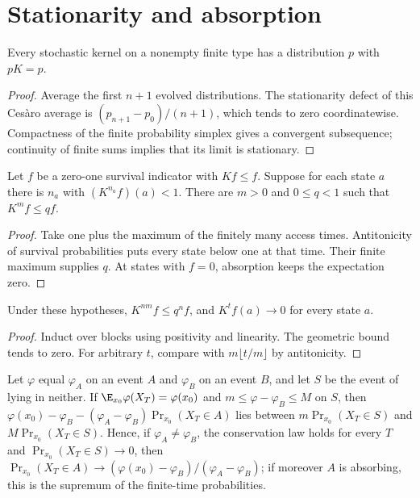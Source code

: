 \section{Stationarity and absorption}
\begin{theorem}\label{thm:stationary}
\leanok{}
Every stochastic kernel on a nonempty finite type has a distribution $p$ with $pK=p$.
\end{theorem}
\begin{proof}\leanok
Average the first $n+1$ evolved distributions. The stationarity defect of this
Ces\`aro average is $(p_{n+1}-p_0)/(n+1)$, which tends to zero coordinatewise.
Compactness of the finite probability simplex gives a convergent subsequence;
continuity of finite sums implies that its limit is stationary.
\end{proof}
\begin{lemma}\label{lem:block}
\leanok{}
Let $f$ be a zero-one survival indicator with $Kf\le f$. Suppose for each
state $a$ there is $n_a$ with $(K^{n_a}f)(a)<1$. There are $m>0$ and
$0\le q<1$ such that $K^m f\le qf$.
\end{lemma}
\begin{proof}\leanok
Take one plus the maximum of the finitely many access times. Antitonicity of
survival probabilities puts every state below one at that time. Their finite
maximum supplies $q$. At states with $f=0$, absorption keeps the expectation zero.
\end{proof}
\begin{theorem}\label{thm:absorption}
\leanok{}
Under these hypotheses, $K^{nm}f\le q^n f$, and $K^t f(a)\to0$ for every state $a$.
\end{theorem}
\begin{proof}\leanok
Induct over blocks using positivity and linearity. The geometric bound tends
to zero. For arbitrary $t$, compare with $m\lfloor t/m\rfloor$ by antitonicity.
\end{proof}
\begin{theorem}\label{thm:optional-stopping}
\leanok{}
Let $\varphi$ equal $\varphi_A$ on an event $A$ and $\varphi_B$ on an event $B$, and let
$S$ be the event of lying in neither. If $\E_{x_0}\varphi(X_T)=\varphi(x_0)$ and
$m\le\varphi-\varphi_B\le M$ on $S$, then
$\varphi(x_0)-\varphi_B-(\varphi_A-\varphi_B)\Pr_{x_0}(X_T\in A)$ lies between
$m\Pr_{x_0}(X_T\in S)$ and $M\Pr_{x_0}(X_T\in S)$. Hence, if $\varphi_A\ne\varphi_B$,
the conservation law holds for every $T$ and $\Pr_{x_0}(X_T\in S)\to0$, then
$\Pr_{x_0}(X_T\in A)\to(\varphi(x_0)-\varphi_B)/(\varphi_A-\varphi_B)$; if moreover $A$
is absorbing, this is the supremum of the finite-time probabilities.
\end{theorem}
